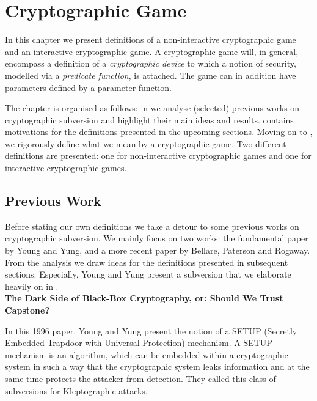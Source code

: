\chapter{Cryptographic Game}

In this chapter we present definitions of a non-interactive cryptographic game and an interactive cryptographic game. A cryptographic game will, in general, encompass a definition of a \emph{cryptographic device} to which a notion of security, modelled via a \emph{predicate function}, is attached. The game can in addition have parameters defined by a parameter function.

The chapter is organised as follows: in  we analyse (selected) previous works on cryptographic subversion and highlight their main ideas and results.  contains motivations for the definitions presented in the upcoming sections. Moving on to , we rigorously define  what we mean by a cryptographic game. Two different definitions are presented: one for non-interactive cryptographic games and one for interactive cryptographic games.

\section{Previous Work}

Before stating our own definitions we take a detour to some previous works on cryptographic subversion. We mainly focus on two works: the fundamental paper \cite{DBLP:conf/crypto/YoungY96} by Young and Yung, and a more recent paper \cite{DBLP:secSym} by Bellare, Paterson and Rogaway. From the analysis we draw ideas for the definitions presented in subsequent sections. Especially, Young and Yung present a subversion that we elaborate heavily on in . \\

\noindent\textbf{The Dark Side of Black-Box Cryptography, or: Should We Trust Capstone? \cite{DBLP:conf/crypto/YoungY96}}

In this 1996 paper, Young and Yung present the notion of a SETUP (Secretly Embedded Trapdoor with Universal Protection) mechanism. A SETUP mechanism is an algorithm, which can be embedded within a cryptographic system in such a way that the cryptographic system leaks information and at the same time protects the attacker from detection. They called this class of subversions for Kleptographic attacks. 

